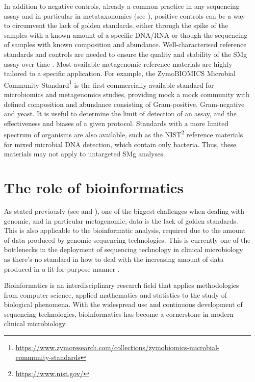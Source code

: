 In addition to negative controls, already a common practice in any sequencing assay and in particular in metataxonomics (see ), positive controls can be a way to circumvent the lack of golden standards, either through the spike of the samples with a known amount of a specific DNA/RNA or though the sequencing of samples with known composition and abundance. Well-characterised reference standards and controls are needed to ensure the quality and stability of the \ac{SMg} assay over time \citep{chiu_clinical_2019, mcintyre_comprehensive_2017}. Most available metagenomic reference materials are highly tailored to a specific application. For example, the ZymoBIOMICS Microbial Community Standard\footnote{\url{https://www.zymoresearch.com/collections/zymobiomics-microbial-community-standards}} is the first commercially available standard for microbiomics and metagenomics studies, providing mock a mock community with defined composition and abundance consisting of Gram-positive, Gram-negative and yeast. It is useful to determine the limit of detection of an assay, and the effectiveness and biases of a given protocol. Standards with a more limited spectrum of organisms are also available, such as the \ac{NIST}\footnote{\url{https://www.nist.gov/}} reference materials for mixed microbial DNA detection, which contain only bacteria. Thus, these materials may not apply to untargeted \ac{SMg} analyses.

\section{The role of bioinformatics} \label{sec:_intro_bioinformatics}

As stated previously (see  and ), one of the biggest challenges when dealing with genomic, and in particular metagenomic, data is the lack of golden standards. This is also applicable to the bioinformatic analysis, required due to the amount of data produced by genomic sequencing technologies. This is currently one of the bottlenecks in the deployment of sequencing technology in clinical microbiology as there's no standard in how to deal with the increasing amount of data produced in a fit-for-purpose manner \citep{carrico_primer_2018}.

Bioinformatics is an interdisciplinary research field that applies methodologies from computer science, applied mathematics and statistics to the study of biological phenomena\citep{carrico_primer_2018}. With the widespread use and continuous development of sequencing technologies, bioinformatics has become a cornerstone in modern clinical microbiology. 

